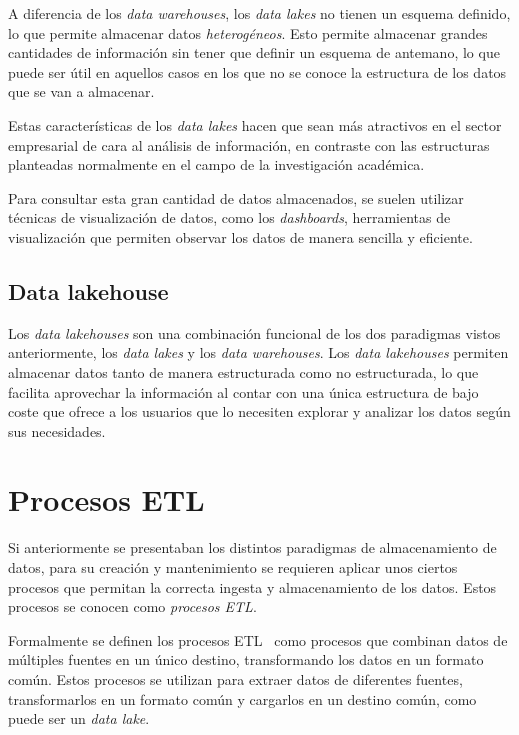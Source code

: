 A diferencia de los \textit{data warehouses}, los \textit{data lakes} no tienen un
esquema definido, lo que permite almacenar datos \textit{heterogéneos}. Esto permite
almacenar grandes cantidades de información sin tener que definir un esquema de antemano,
lo que puede ser útil en aquellos casos en los que no se conoce la estructura de los
datos que se van a almacenar.

Estas características de los \textit{data lakes} hacen que sean más atractivos en el sector
empresarial de cara al análisis de información, en contraste con las estructuras planteadas
normalmente en el campo de la investigación académica.

Para consultar esta gran cantidad de datos almacenados, se suelen utilizar técnicas de
visualización de datos, como los \textit{dashboards}, herramientas de visualización que
permiten observar los datos de manera sencilla y eficiente.

\subsection{Data lakehouse}\label{sec:lakehouse}
Los \textit{data lakehouses} son una combinación funcional de los dos paradigmas vistos
anteriormente, los \textit{data lakes} y los \textit{data warehouses}. Los \textit{data
lakehouses} permiten almacenar datos tanto de manera estructurada como no estructurada,
lo que facilita aprovechar la información al contar con una única estructura de bajo coste
que ofrece a los usuarios que lo necesiten explorar y analizar los datos según sus necesidades.


\newpage{}
\section{Procesos ETL}\label{sec:etl}
Si anteriormente se presentaban los distintos paradigmas de almacenamiento de datos, para su creación
y mantenimiento se requieren aplicar unos ciertos procesos que permitan la correcta ingesta y
almacenamiento de los datos. Estos procesos se conocen como \textit{procesos ETL}.

Formalmente se definen los procesos ETL~\cite{mier2023dashboards} como procesos que combinan datos de
múltiples fuentes en un único destino, transformando los datos en un formato común. Estos procesos
se utilizan para extraer datos de diferentes fuentes, transformarlos en un formato común
y cargarlos en un destino común, como puede ser un \textit{data lake}.

